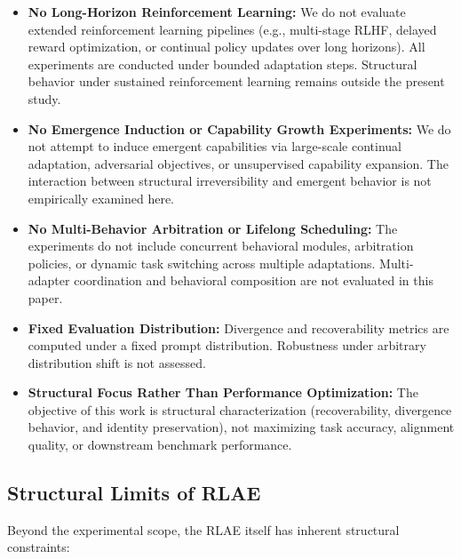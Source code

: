 \documentclass[10pt]{article}
\begin{document}
	\begin{itemize}
		\item \textbf{No Long-Horizon Reinforcement Learning:}
		We do not evaluate extended reinforcement learning pipelines (e.g., multi-stage RLHF, delayed reward optimization, or continual policy updates over long horizons). All experiments are conducted under bounded adaptation steps. Structural behavior under sustained reinforcement learning remains outside the present study.
		
		\item \textbf{No Emergence Induction or Capability Growth Experiments:}
		We do not attempt to induce emergent capabilities via large-scale continual adaptation, adversarial objectives, or unsupervised capability expansion. The interaction between structural irreversibility and emergent behavior is not empirically examined here.
		
		\item \textbf{No Multi-Behavior Arbitration or Lifelong Scheduling:}
		The experiments do not include concurrent behavioral modules, arbitration policies, or dynamic task switching across multiple adaptations. Multi-adapter coordination and behavioral composition are not evaluated in this paper.
		
		\item \textbf{Fixed Evaluation Distribution:}
		Divergence and recoverability metrics are computed under a fixed prompt distribution. Robustness under arbitrary distribution shift is not assessed.
		
		\item \textbf{Structural Focus Rather Than Performance Optimization:}
		The objective of this work is structural characterization (recoverability, divergence behavior, and identity preservation), not maximizing task accuracy, alignment quality, or downstream benchmark performance.
	\end{itemize}
	
	\subsection{Structural Limits of RLAE}
	
	Beyond the experimental scope, the RLAE itself has inherent structural constraints:
	
\end{document}

